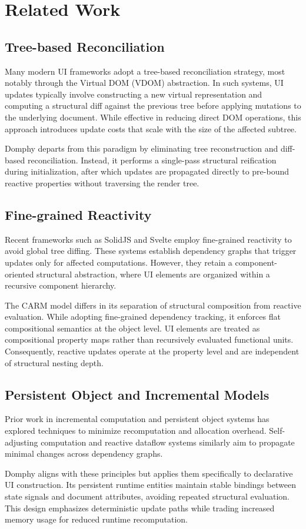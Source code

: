 \section{Related Work}

\subsection{Tree-based Reconciliation}

Many modern UI frameworks adopt a tree-based reconciliation strategy, most notably through the Virtual DOM (VDOM) abstraction. In such systems, UI updates typically involve constructing a new virtual representation and computing a structural diff against the previous tree before applying mutations to the underlying document. While effective in reducing direct DOM operations, this approach introduces update costs that scale with the size of the affected subtree. 

Domphy departs from this paradigm by eliminating tree reconstruction and diff-based reconciliation. Instead, it performs a single-pass structural reification during initialization, after which updates are propagated directly to pre-bound reactive properties without traversing the render tree.

\subsection{Fine-grained Reactivity}

Recent frameworks such as SolidJS and Svelte employ fine-grained reactivity to avoid global tree diffing. These systems establish dependency graphs that trigger updates only for affected computations. However, they retain a component-oriented structural abstraction, where UI elements are organized within a recursive component hierarchy.

The CARM model differs in its separation of structural composition from reactive evaluation. While adopting fine-grained dependency tracking, it enforces flat compositional semantics at the object level. UI elements are treated as compositional property maps rather than recursively evaluated functional units. Consequently, reactive updates operate at the property level and are independent of structural nesting depth.

\subsection{Persistent Object and Incremental Models}

Prior work in incremental computation and persistent object systems has explored techniques to minimize recomputation and allocation overhead. Self-adjusting computation and reactive dataflow systems similarly aim to propagate minimal changes across dependency graphs.

Domphy aligns with these principles but applies them specifically to declarative UI construction. Its persistent runtime entities maintain stable bindings between state signals and document attributes, avoiding repeated structural evaluation. This design emphasizes deterministic update paths while trading increased memory usage for reduced runtime recomputation.
